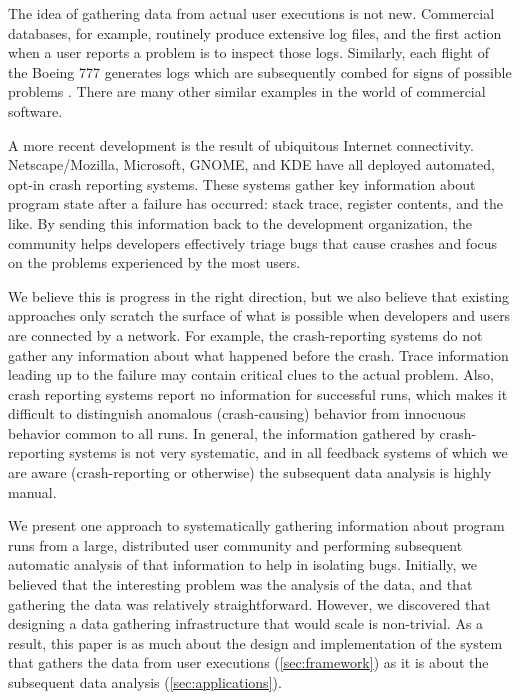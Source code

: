 The idea of gathering data from actual user executions is not new.
Commercial databases, for example, routinely produce extensive log
files, and the first action when a user reports a problem is to
inspect those logs.  Similarly, each flight of the Boeing 777
generates logs which are subsequently combed for signs of possible
problems \cite{Esler:2001:WVR}.  There are many other similar examples
in the world of commercial software.

A more recent development is the result of ubiquitous Internet
connectivity.  Netscape/Mozilla, Microsoft, GNOME, and KDE have all
deployed automated, opt-in crash reporting systems.  These systems
gather key information about program state after a failure has
occurred: stack trace, register contents, and the like.  By sending
this information back to the development organization, the community
helps developers effectively triage bugs that cause crashes and focus
on the problems experienced by the most users.

We believe this is progress in the right direction, but we also
believe that existing approaches only scratch the surface of what is
possible when developers and users are connected by a network.  For
example, the crash-reporting systems do not gather any information
about what happened before the crash.  Trace information leading up to
the failure may contain critical clues to the actual problem.  Also,
crash reporting systems report no information for successful runs,
which makes it difficult to distinguish anomalous (crash-causing)
behavior from innocuous behavior common to all runs.  In general, the
information gathered by crash-reporting systems is not very
systematic, and in all feedback systems of which we are aware
(crash-reporting or otherwise) the subsequent data analysis is highly
manual.

We present one approach to systematically gathering information about
program runs from a large, distributed user community and performing
subsequent automatic analysis of that information to help in isolating
bugs.  Initially, we believed that the interesting problem was the
analysis of the data, and that gathering the data was relatively
straightforward.  However, we discovered that designing a data
gathering infrastructure that would scale is non-trivial.  As a
result, this paper is as much about the design and implementation of
the system that gathers the data from user executions
(\autoref{sec:framework}) as it is about the subsequent data analysis
(\autoref{sec:applications}).

